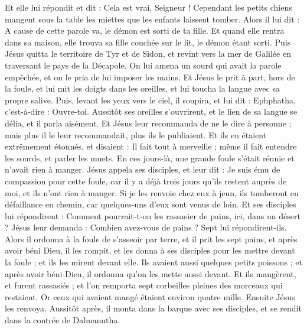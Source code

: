 \begin{multicols}{2}
Et elle lui répondit et dit : Cela est vrai, Seigneur ! Cependant les petits chiens mangent sous la table les miettes que les enfants laissent tomber.
Alors il lui dit : A cause de cette parole va, le démon est sorti de ta fille.
Et quand elle rentra dans sa maison, elle trouva sa fille couchée sur le lit, le démon étant sorti.
Puis Jésus quitta le territoire de Tyr et de Sidon, et revint vers la mer de Galilée en traversant le pays de la Décapole.
On lui amena un sourd qui avait la parole empêchée, et on le pria de lui imposer les mains.
Et Jésus le prit à part, hors de la foule, et lui mit les doigts dans les oreilles, et lui toucha la langue avec sa propre salive.
Puis, levant les yeux vers le ciel, il soupira, et lui dit : Ephphatha, c'est-à-dire : Ouvre-toi.
Aussitôt ses oreilles s'ouvrirent, et le lien de sa langue se délia, et il parla aisément.
Et Jésus leur recommanda de ne le dire à personne ; mais plus il le leur recommandait, plus ils le publiaient.
Et ils en étaient extrêmement étonnés, et disaient : Il fait tout à merveille ; même il fait entendre les sourds, et parler les muets.
\VerseOne{}En ces jours-là, une grande foule s’était réunie et n’avait rien à manger. Jésus appela ses disciples, et leur dit :
Je suis ému de compassion pour cette foule, car il y a déjà trois jours qu'ils restent auprès de moi, et ils n'ont rien à manger.
Si je les renvoie chez eux à jeun, ils tomberont en défaillance en chemin, car quelques-uns d'eux sont venus de loin.
Et ses disciples lui répondirent : Comment pourrait-t-on les rassasier de pains, ici, dans un désert ?
Jésus leur demanda : Combien avez-vous de pains ? Sept lui répondirent-ils.
Alors il ordonna à la foule de s'asseoir par terre, et il prit les sept pains, et après avoir béni Dieu, il les rompit, et les donna à ses disciples pour les mettre devant la foule ; et ils les mirent devant elle.
Ils avaient aussi quelques petits poissons ; et après avoir béni Dieu, il ordonna qu'on les mette aussi devant.
Et ils mangèrent, et furent rassasiés ; et l’on remporta sept corbeilles pleines des morceaux qui restaient.
Or ceux qui avaient mangé étaient environ quatre mille. Ensuite Jésus les renvoya.
Aussitôt après, il monta dans la barque avec ses disciples, et se rendit dans la contrée de Dalmanutha.

\end{multicols}
